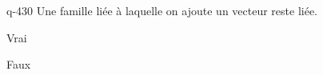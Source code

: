 \begin{truefalse}{q-430}
Une famille liée à laquelle on ajoute un vecteur reste liée.
\item* Vrai
\item Faux
\end{truefalse}

